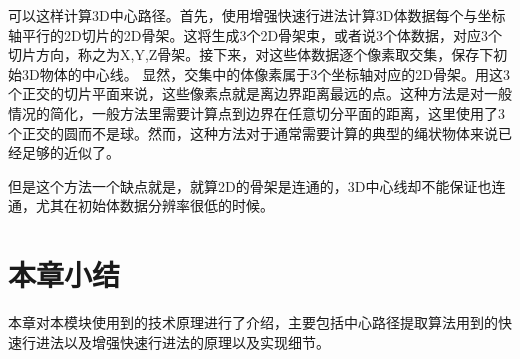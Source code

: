 可以这样计算3D中心路径。首先，使用增强快速行进法计算3D体数据每个与坐标轴平行的2D切片的2D骨架。这将生成3个2D骨架束，或者说3个体数据，对应3个切片方向，称之为X,Y,Z骨架。接下来，对这些体数据逐个像素取交集，保存下初始3D物体的中心线。
显然，交集中的体像素属于3个坐标轴对应的2D骨架。用这3个正交的切片平面来说，这些像素点就是离边界距离最远的点。这种方法是对一般情况的简化，一般方法里需要计算点到边界在任意切分平面的距离，这里使用了3个正交的圆而不是球。然而，这种方法对于通常需要计算的典型的绳状物体来说已经足够的近似了。

但是这个方法一个缺点就是，就算2D的骨架是连通的，3D中心线却不能保证也连通，尤其在初始体数据分辨率很低的时候。

\section{本章小结}
本章对本模块使用到的技术原理进行了介绍，主要包括中心路径提取算法用到的快速行进法以及增强快速行进法的原理以及实现细节。
